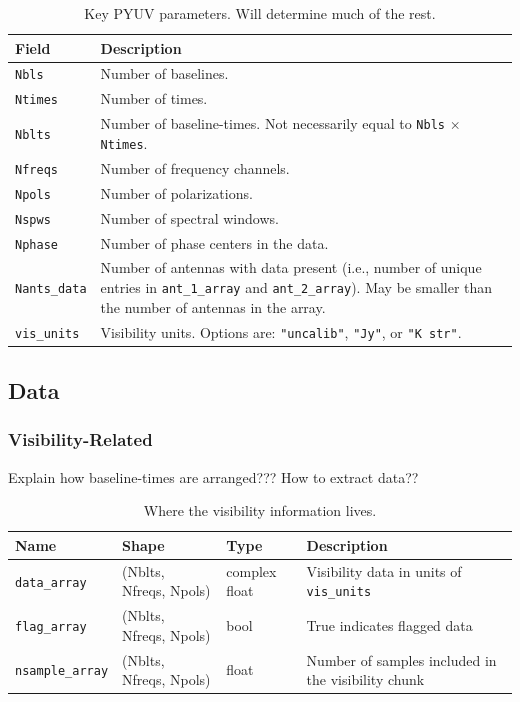 \begin{table}[H]
\centering
\begin{tabular}{|l|p{15cm}|}
\hline
\textbf{Field} & \textbf{Description} \\
\hline
\texttt{Nbls} & Number of baselines. \\
\hline
\texttt{Ntimes} & Number of times. \\
\hline
\texttt{Nblts} & Number of baseline-times. Not necessarily equal to \texttt{Nbls} $\times$ \texttt{Ntimes}. \\
\hline
\texttt{Nfreqs} & Number of frequency channels. \\
\hline
\texttt{Npols} & Number of polarizations. \\
\hline
\texttt{Nspws} & Number of spectral windows. \\
\hline
\texttt{Nphase} & Number of phase centers in the data. \\
\hline
\texttt{Nants\_data} & Number of antennas with data present (i.e., number of unique entries in \texttt{ant\_1\_array} and \texttt{ant\_2\_array}). May be smaller than the number of antennas in the array. \\
\hline
\texttt{vis\_units} & Visibility units. Options are: \texttt{"uncalib"}, \texttt{"Jy"}, or \texttt{"K str"}. \\
\hline
\end{tabular}
\caption{Key PYUV parameters. Will determine much of the rest.}
\end{table}


\subsection{Data}

\subsubsection{Visibility-Related}

Explain how baseline-times are arranged??? How to extract data??

\begin{table}[H]
\centering
\begin{tabular}{|l|l|l|p{5cm}|}
\hline
\textbf{Name} & \textbf{Shape} & \textbf{Type} & \textbf{Description} \\
\hline
\texttt{data\_array} & (Nblts, Nfreqs, Npols) & complex float & Visibility data in units of \texttt{vis\_units} \\
\hline
\texttt{flag\_array} & (Nblts, Nfreqs, Npols) & bool & True indicates flagged data \\
\hline
\texttt{nsample\_array} & (Nblts, Nfreqs, Npols) & float & Number of samples included in the visibility chunk\footnotemark[1] \\
\hline
\end{tabular}
\caption{Where the visibility information lives.}
\end{table}

